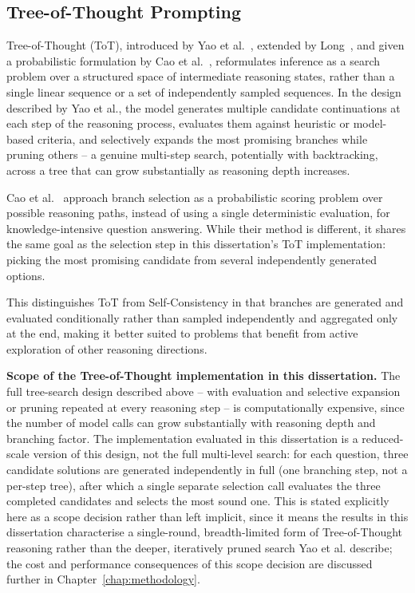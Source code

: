 \subsection{Tree-of-Thought Prompting}
\label{sec:tot-scope}

Tree-of-Thought (ToT), introduced by Yao et al.~\cite{yao2023tree},
extended by Long~\cite{long2023tot}, and given a probabilistic
formulation by Cao et al.~\cite{cao2023probabilistic}, reformulates
inference as a search
problem over a structured space of intermediate reasoning states, rather
than a single linear sequence or a set of independently sampled sequences.
In the design described by Yao et al., the model generates multiple
candidate continuations at each step of the reasoning process, evaluates
them against heuristic or model-based criteria, and selectively expands
the most promising branches while pruning others -- a genuine
multi-step search, potentially with backtracking, across a tree that can
grow substantially as reasoning depth increases.

Cao et al.~\cite{cao2023probabilistic} approach branch selection as a
probabilistic scoring problem over possible reasoning paths, instead of
using a single deterministic evaluation, for knowledge-intensive
question answering. While their method is different, it shares the same
goal as the selection step in this dissertation's ToT implementation:
picking the most promising candidate from several independently
generated options.

This distinguishes ToT from Self-Consistency in that branches are
generated and evaluated conditionally rather than sampled independently
and aggregated only at the end, making it better suited to problems that
benefit from active exploration of other reasoning directions.

\textbf{Scope of the Tree-of-Thought implementation in this dissertation.}
The full tree-search design described above -- with evaluation and
selective expansion or pruning repeated at every reasoning step -- is
computationally expensive, since the number of model calls can grow
substantially with reasoning depth and branching factor. The
implementation evaluated in this dissertation is a reduced-scale version
of this design, not the full multi-level search: for each question, three
candidate solutions are generated independently in full (one branching
step, not a per-step tree), after which a single separate selection call
evaluates the three completed candidates and selects the most sound one.
This is stated explicitly here as a scope decision rather than left
implicit, since it means the results in this dissertation characterise a
single-round, breadth-limited form of Tree-of-Thought reasoning rather
than the deeper, iteratively pruned search Yao et al. describe; the cost
and performance consequences of this scope decision are discussed further
in Chapter~\ref{chap:methodology}.

